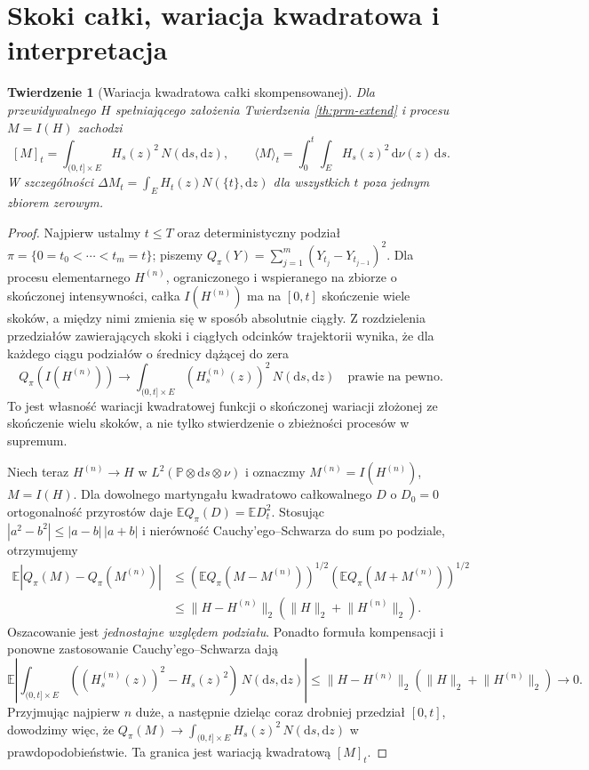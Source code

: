 \documentclass[11pt,a4paper,oneside]{report}
\numberwithin{equation}{chapter}
\theoremstyle{plain}
\newtheorem{twierdzenie}{Twierdzenie}[chapter]
\theoremstyle{definition}
\theoremstyle{remark}
\newcommand{\Prob}{\mathbb{P}}
\newcommand{\E}{\mathbb{E}}
\newcommand{\dd}{\mathrm{d}}
\newcommand{\norm}[1]{\lVert #1\rVert}
\begin{document}
\section{Skoki całki, wariacja kwadratowa i interpretacja}\label{sec:volIII:11:04}

\begin{twierdzenie}[Wariacja kwadratowa całki skompensowanej]\label{thm:volIII:11:05}
\label{th:prm-bracket}
Dla przewidywalnego $H$ spełniającego założenia
Twierdzenia \ref{th:prm-extend} i procesu $M=I(H)$ zachodzi
\[
[M]_t=\int_{(0,t]\times E}H_s(z)^2\,N(\dd s,\dd z),
\qquad
\langle M\rangle_t=\int_0^t\int_EH_s(z)^2\,\dd\nu(z)\,\dd s.
\tag{11.3}\label{eq:prm-brackets}
\]
W szczególności $\Delta M_t=\int_EH_t(z)N(\{t\},\dd z)$
dla wszystkich $t$ poza jednym zbiorem zerowym.
\end{twierdzenie}
\begin{proof}
Najpierw ustalmy $t\le T$ oraz deterministyczny podział
$\pi=\{0=t_0<\cdots<t_m=t\}$; piszemy
$Q_\pi(Y)=\sum_{j=1}^m(Y_{t_j}-Y_{t_{j-1}})^2$.
Dla procesu elementarnego $H^{(n)}$, ograniczonego i
wspieranego na zbiorze o skończonej intensywności, całka
$I(H^{(n)})$ ma na $[0,t]$ skończenie wiele skoków, a między
nimi zmienia się w sposób absolutnie ciągły. Z rozdzielenia
przedziałów zawierających skoki i ciągłych odcinków trajektorii
wynika, że dla każdego ciągu podziałów o średnicy dążącej do zera
\[
 Q_\pi(I(H^{(n)}))\longrightarrow
 \int_{(0,t]\times E}(H_s^{(n)}(z))^2\,N(\dd s,\dd z)
 \quad\text{prawie na pewno}.
\]
To jest własność wariacji kwadratowej funkcji o skończonej
wariacji złożonej ze skończenie wielu skoków, a nie tylko
stwierdzenie o zbieżności procesów w supremum.

Niech teraz $H^{(n)}\to H$ w
$L^2(\Prob\otimes\dd s\otimes\nu)$ i oznaczmy
$M^{(n)}=I(H^{(n)})$, $M=I(H)$. Dla dowolnego martyngału
kwadratowo całkowalnego $D$ o $D_0=0$ ortogonalność
przyrostów daje
$\E Q_\pi(D)=\E D_t^2$. Stosując
$|a^2-b^2|\le |a-b|\,|a+b|$ i nierówność
Cauchy'ego--Schwarza do sum po podziale, otrzymujemy
\[
\begin{split}
\E|Q_\pi(M)-Q_\pi(M^{(n)})|
&\le (\E Q_\pi(M-M^{(n)}))^{1/2}
      (\E Q_\pi(M+M^{(n)}))^{1/2}\\
&\le \norm{H-H^{(n)}}_2
      (\norm H_2+\norm{H^{(n)}}_2).
\end{split}
\]
Oszacowanie jest \emph{jednostajne względem podziału}.
Ponadto formuła kompensacji i ponowne zastosowanie
Cauchy'ego--Schwarza dają
\[
\E\left|\int_{(0,t]\times E} ((H_s^{(n)}(z))^2-H_s(z)^2)\,N(\dd s,\dd z)\right|
\le\norm{H-H^{(n)}}_2
  (\norm H_2+\norm{H^{(n)}}_2)\longrightarrow0.
\]
Przyjmując najpierw $n$ duże, a następnie dzieląc coraz
drobniej przedział $[0,t]$, dowodzimy więc, że
$Q_\pi(M)\to\int_{(0,t]\times E} H_s(z)^2\,N(\dd s,\dd z)$ w prawdopodobieństwie.
Ta granica jest wariacją kwadratową $[M]_t$.


\end{proof}
\end{document}
